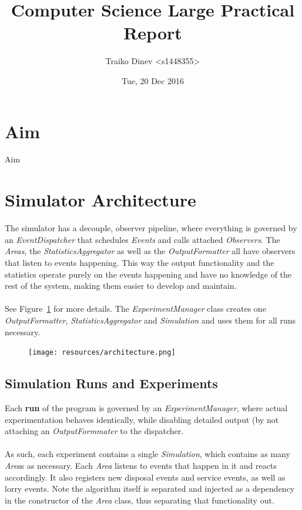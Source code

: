 \documentclass{article}
\title{Computer Science Large Practical Report}
\date{Tue, 20 Dec 2016}
\author{Traiko Dinev \textless s1448355\textgreater}
\begin{document}
	\maketitle

    \section{Aim}
		Aim
	
	\section{Simulator Architecture}
		The simulator has a decouple, observer pipeline, where everything is governed by an \textit{EventDispatcher} that schedules
		\textit{Events} and calls attached \textit{Observers}. The \textit{Areas}, the \textit{StatisticsAggregator} as well as the
		\textit{OutputFormatter} all have observers that listen to events happening. This way the output functionality and the statistics
		operate purely on the events happening and have no knowledge of the rest of the system, making them easier to develop and maintain.
		\\ \\
		See Figure~\ref{fig:fig1} for more details. The \textit{ExperimentManager} class creates one \textit{OutputFormatter}, \textit{StatisticsAggregator}
		and \textit{Simulation} and uses them for all runs necessary.

		\begin{figure}[H]
		\centering
			\texttt{[image: resources/architecture.png]}
			\label{fig:fig1} 
		\end{figure}

	\subsection{Simulation Runs and Experiments}
		Each \textbf{run} of the program is governed by an \textit{ExperimentManager}, where actual experimentation behaves identically, while
		disabling detailed output (by not attaching an \textit{OutputFormmater} to the dispatcher.
		\\
		\\
		As such, each experiment contains a single \textit{Simulation}, which contains as many \textit{Area}s as necessary.
		Each \textit{Area} listens to events that happen in it and reacts accordingly. It also registers new disposal events and service events,
		as well as lorry events. Note the algorithm itself is separated and injected as a dependency in the constructor of the \textit{Area} class, thus
		separating that functionality out.
\end{document}
